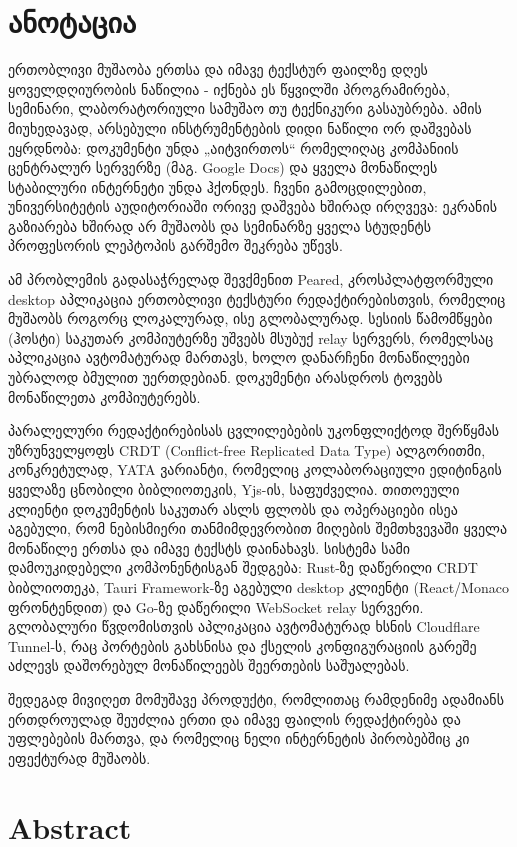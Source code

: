 \section*{ანოტაცია}

ერთობლივი მუშაობა ერთსა და იმავე ტექსტურ ფაილზე დღეს ყოველდღიურობის ნაწილია
- იქნება ეს წყვილში პროგრამირება, სემინარი, ლაბორატორიული სამუშაო თუ
ტექნიკური გასაუბრება. ამის მიუხედავად, არსებული ინსტრუმენტების დიდი ნაწილი
ორ დაშვებას ეყრდნობა: დოკუმენტი უნდა „აიტვირთოს“ რომელიღაც კომპანიის
ცენტრალურ სერვერზე (მაგ. Google Docs) და ყველა მონაწილეს სტაბილური ინტერნეტი უნდა ჰქონდეს.
ჩვენი გამოცდილებით, უნივერსიტეტის აუდიტორიაში ორივე დაშვება ხშირად
ირღვევა: ეკრანის გაზიარება ხშირად არ მუშაობს და სემინარზე
ყველა სტუდენტს პროფესორის ლეპტოპის გარშემო შეკრება უწევს.

ამ პრობლემის გადასაჭრელად შევქმენით Peared, კროსპლატფორმული desktop
აპლიკაცია ერთობლივი ტექსტური რედაქტირებისთვის, რომელიც მუშაობს როგორც
ლოკალურად, ისე გლობალურად. სესიის
წამომწყები (ჰოსტი) საკუთარ კომპიუტერზე უშვებს მსუბუქ relay სერვერს,
რომელსაც აპლიკაცია ავტომატურად მართავს, ხოლო დანარჩენი მონაწილეები
უბრალოდ ბმულით უერთდებიან. დოკუმენტი არასდროს ტოვებს მონაწილეთა
კომპიუტერებს. 

პარალელური რედაქტირებისას ცვლილებების უკონფლიქტოდ შერწყმას უზრუნველყოფს
CRDT (Conflict-free Replicated Data Type) ალგორითმი, კონკრეტულად, YATA
ვარიანტი, რომელიც კოლაბორაციული ედიტინგის ყველაზე ცნობილი ბიბლიოთეკის,
Yjs-ის, საფუძველია. თითოეული კლიენტი დოკუმენტის
საკუთარ ასლს ფლობს და ოპერაციები ისეა აგებული, რომ ნებისმიერი თანმიმდევრობით
მიღების შემთხვევაში ყველა მონაწილე ერთსა და იმავე ტექსტს დაინახავს. სისტემა
სამი დამოუკიდებელი კომპონენტისგან შედგება: Rust-ზე დაწერილი CRDT ბიბლიოთეკა,
Tauri Framework-ზე აგებული desktop კლიენტი (React/Monaco ფრონტენდით) და Go-ზე
დაწერილი WebSocket relay სერვერი. გლობალური წვდომისთვის აპლიკაცია
ავტომატურად ხსნის Cloudflare Tunnel-ს, რაც პორტების გახსნისა და ქსელის
კონფიგურაციის გარეშე აძლევს დაშორებულ მონაწილეებს შეერთების საშუალებას.

შედეგად მივიღეთ მომუშავე პროდუქტი, რომლითაც რამდენიმე ადამიანს
ერთდროულად შეუძლია ერთი და იმავე ფაილის რედაქტირება და უფლებების მართვა,
და რომელიც ნელი ინტერნეტის პირობებშიც კი ეფექტურად მუშაობს.

\clearpage
\section*{Abstract}

